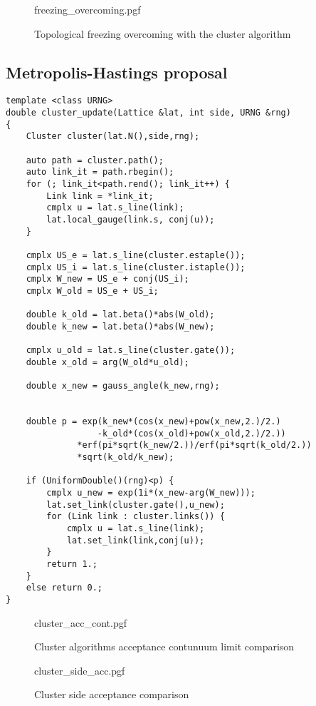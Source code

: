 \begin{figure}[!htb]
    \centering
    {freezing_overcoming.pgf}
    \caption{Topological freezing overcoming with the cluster algorithm}
    \label{fig:freezing_overcoming}
\end{figure}


\subsection*{Metropolis-Hastings proposal}
\begin{lstlisting}[caption={Metropolis-Hastings cluster update}]
template <class URNG>
double cluster_update(Lattice &lat, int side, URNG &rng)
{
    Cluster cluster(lat.N(),side,rng);

    auto path = cluster.path();
    auto link_it = path.rbegin();
    for (; link_it<path.rend(); link_it++) {
        Link link = *link_it;
        cmplx u = lat.s_line(link);
        lat.local_gauge(link.s, conj(u));
    }
    
    cmplx US_e = lat.s_line(cluster.estaple());
    cmplx US_i = lat.s_line(cluster.istaple());
    cmplx W_new = US_e + conj(US_i);
    cmplx W_old = US_e + US_i;
    
    double k_old = lat.beta()*abs(W_old);
    double k_new = lat.beta()*abs(W_new);

    cmplx u_old = lat.s_line(cluster.gate());
    double x_old = arg(W_old*u_old);
    
    double x_new = gauss_angle(k_new,rng);
    

    double p = exp(k_new*(cos(x_new)+pow(x_new,2.)/2.)
                  -k_old*(cos(x_old)+pow(x_old,2.)/2.))
              *erf(pi*sqrt(k_new/2.))/erf(pi*sqrt(k_old/2.))
              *sqrt(k_old/k_new);
    
    if (UniformDouble()(rng)<p) {
        cmplx u_new = exp(1i*(x_new-arg(W_new)));
        lat.set_link(cluster.gate(),u_new);
        for (Link link : cluster.links()) {
            cmplx u = lat.s_line(link);
            lat.set_link(link,conj(u));
        }
        return 1.;
    }
    else return 0.;
}
\end{lstlisting}

\begin{figure}[!htb]
    \centering
    {cluster_acc_cont.pgf}
    \caption{Cluster algorithms acceptance contunuum limit comparison}
    \label{fig:cluster_acc_cont}
\end{figure}

\begin{figure}[!htb]
	\centering
    {cluster_side_acc.pgf}
    \caption{Cluster side acceptance comparison}
    \label{fig:cluster_side_acc}
\end{figure}

